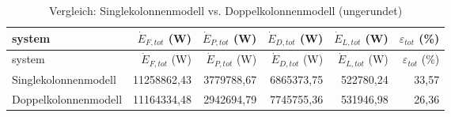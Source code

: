 \begin{longtable}{lrrrrr}
\caption{Vergleich: Singlekolonnenmodell vs. Doppelkolonnenmodell (ungerundet)} \\
\hline
system & $\dot{E}_{F,tot}$ (W) & $\dot{E}_{P,tot}$ (W) & $\dot{E}_{D,tot}$ (W) & $\dot{E}_{L,tot}$ (W) & $\varepsilon_{tot}$ (\%) \\
\hline
\endfirsthead

\hline
system & $\dot{E}_{F,tot}$ (W) & $\dot{E}_{P,tot}$ (W) & $\dot{E}_{D,tot}$ (W) & $\dot{E}_{L,tot}$ (W) & $\varepsilon_{tot}$ (\%) \\
\hline
\endhead

\hline
\endfoot

\hline
\endlastfoot

Singlekolonnenmodell & 11258862,43 & 3779788,67 & 6865373,75 & 522780,24 & 33,57 \\
Doppelkolonnenmodell & 11164334,48 & 2942694,79 & 7745755,36 & 531946,98 & 26,36 \\
\hline
\end{longtable}
